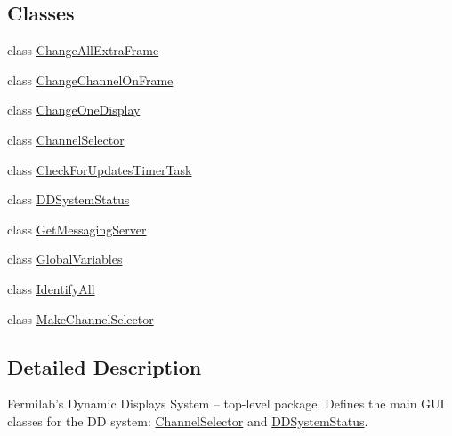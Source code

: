 \subsection*{Classes}
\begin{DoxyCompactItemize}
\item 
class \hyperlink{classgov_1_1fnal_1_1ppd_1_1dd_1_1ChangeAllExtraFrame}{Change\-All\-Extra\-Frame}
\item 
class \hyperlink{classgov_1_1fnal_1_1ppd_1_1dd_1_1ChangeChannelOnFrame}{Change\-Channel\-On\-Frame}
\item 
class \hyperlink{classgov_1_1fnal_1_1ppd_1_1dd_1_1ChangeOneDisplay}{Change\-One\-Display}
\item 
class \hyperlink{classgov_1_1fnal_1_1ppd_1_1dd_1_1ChannelSelector}{Channel\-Selector}
\item 
class \hyperlink{classgov_1_1fnal_1_1ppd_1_1dd_1_1CheckForUpdatesTimerTask}{Check\-For\-Updates\-Timer\-Task}
\item 
class \hyperlink{classgov_1_1fnal_1_1ppd_1_1dd_1_1DDSystemStatus}{D\-D\-System\-Status}
\item 
class \hyperlink{classgov_1_1fnal_1_1ppd_1_1dd_1_1GetMessagingServer}{Get\-Messaging\-Server}
\item 
class \hyperlink{classgov_1_1fnal_1_1ppd_1_1dd_1_1GlobalVariables}{Global\-Variables}
\item 
class \hyperlink{classgov_1_1fnal_1_1ppd_1_1dd_1_1IdentifyAll}{Identify\-All}
\item 
class \hyperlink{classgov_1_1fnal_1_1ppd_1_1dd_1_1MakeChannelSelector}{Make\-Channel\-Selector}
\end{DoxyCompactItemize}


\subsection{Detailed Description}
Fermilab's Dynamic Displays System -- top-\/level package. Defines the main G\-U\-I classes for the D\-D system\-: \hyperlink{classgov_1_1fnal_1_1ppd_1_1dd_1_1ChannelSelector}{Channel\-Selector} and \hyperlink{classgov_1_1fnal_1_1ppd_1_1dd_1_1DDSystemStatus}{D\-D\-System\-Status}.
